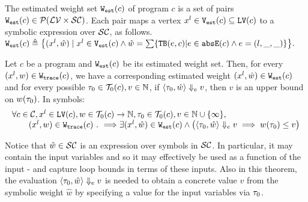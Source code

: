 \begin{defn}
  \vspace{-0.1cm}
 \label{def:adaptfun-weight}
The estimated weight set $\mathtt{{W_{est}}}(c)$ of program $c$ is a set of pairs $\mathtt{{W_{est}}}(c) \in \mathcal{P}(\mathcal{LV} \times \mathcal{SC})$.
Each pair maps
a vertex $x^l \in\mathtt{{V_{est}}}(c)\subseteq  \mathtt{LV}(c)$ to a symbolic expression over $\mathcal{SC}$,
as follows.
 $
 \progW(c) \triangleq
 \left\{ (x^l, \hat{w}) 
\mid
x^l \in \progV(c) 
\land 
\hat{w} = 
\sum\left\{ \absclr(e, c) \middle\vert e \in \absE(c) \land e = (l, \_, \_) \right\}
\right\}.
$
\end{defn}
%
\begin{thm}
 \label{thm:addweight_soundness}
 \vspace{-0.1cm}
Let ${c}$ be a program and $\mathtt{{W_{est}}}(c)$ be its estimated weight set.
Then, for every  $(x^l, w) \in \mathtt{{W_{trace}}}(c) $,
we have a corresponding estimated weight $(x^l, \hat{w}) \in \mathtt{{W_{est}}}(c)$ and for every possible 
$\mathtt{\tau}_0 \in \mathcal{T}_0(c),
v \in \mathbb{N}$,
if $\langle \mathtt{\tau}_0, \hat{w} \rangle \Downarrow_e v$,
then $v$ is an upper bound on ${w}(\mathtt{\tau}_0)$. In symbols:
\[
 \begin{array}{l}
 \forall c \in \mathcal{C}, x^l \in \mathtt{LV}(c),w\in \mathcal{T}_0(c)\to \mathbb{N},\mathtt{\tau}_0 \in \mathcal{T}_0(c), 
v \in \mathbb{N}\cup \{\infty\}, 
\\ \qquad
(x^l, w) \in \mathtt{{W_{trace}}}(c) ~.~ \Longrightarrow
\exists
(x^l, \hat{w}) \in \mathtt{{W_{est}}}(c) 
\land
\big(
 \langle \mathtt{\tau}_0, \hat{w} \rangle \Downarrow_e v \implies w(\mathtt{\tau}_0) \leq v
\big)
\end{array}
\]
\end{thm}
Notice that $\hat{w} \in \mathcal{SC}$ is an expression over symbols in $\mathcal{SC}$. In particular, it may contain the input variables and so it may effectively be used as a function of the input - and capture loop bounds in terms of these inputs.
Also in this theorem, the evaluation $\langle \mathtt{\tau}_0, \hat{w} \rangle \Downarrow_e v$ is needed to obtain a concrete value $v$ from the symbolic weight $\hat{w}$ by specifying a value for the input variables via $\mathtt{\tau}_0$.


